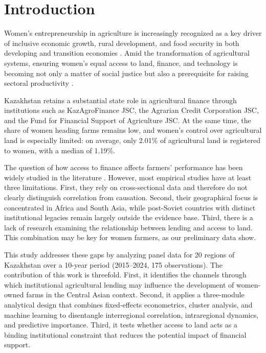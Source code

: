 \documentclass[pdflatex,sn-mathphys-ay]{sn-jnl}
\begin{document}


\maketitle

\section{Introduction}\label{sec:introduction}

Women's entrepreneurship in agriculture is increasingly recognized as a key driver of inclusive economic growth, rural development, and food security in both developing and transition economies \citep{ref78}. Amid the transformation of agricultural systems, ensuring women's equal access to land, finance, and technology is becoming not only a matter of social justice but also a prerequisite for raising sectoral productivity \citep{ref62,ref26}.

Kazakhstan retains a substantial state role in agricultural finance through institutions such as KazAgroFinance JSC, the Agrarian Credit Corporation JSC, and the Fund for Financial Support of Agriculture JSC. At the same time, the share of women heading farms remains low, and women's control over agricultural land is especially limited: on average, only 2.01\% of agricultural land is registered to women, with a median of 1.19\%.

The question of how access to finance affects farmers' performance has been widely studied in the literature \citep{ref94,ref99}. However, most empirical studies have at least three limitations. First, they rely on cross-sectional data and therefore do not clearly distinguish correlation from causation. Second, their geographical focus is concentrated in Africa and South Asia, while post-Soviet countries with distinct institutional legacies remain largely outside the evidence base. Third, there is a lack of research examining the relationship between lending and access to land. This combination may be key for women farmers, as our preliminary data show.

This study addresses these gaps by analyzing panel data for 20 regions of Kazakhstan over a 10-year period (2015--2024, 175 observations). The contribution of this work is threefold. First, it identifies the channels through which institutional agricultural lending may influence the development of women-owned farms in the Central Asian context. Second, it applies a three-module analytical design that combines fixed-effects econometrics, cluster analysis, and machine learning to disentangle interregional correlation, intraregional dynamics, and predictive importance. Third, it tests whether access to land acts as a binding institutional constraint that reduces the potential impact of financial support.
\end{document}
